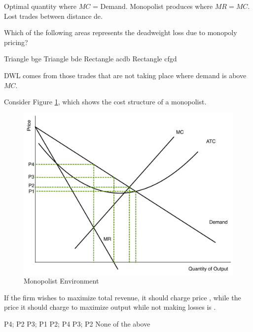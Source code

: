 \documentclass[addpoints,11pt]{exam}
\theoremstyle{definition}
\begin{document}
\begin{questions}
	\begin{solution}
		Optimal quantity where $MC$ = Demand. Monopolist produces where $MR = MC$. Lost trades between distance de.
	\end{solution}
	
	\question \label{blah6} Which of the following areas represents the deadweight loss due to monopoly pricing?
	
	\begin{choices}
		\CorrectChoice Triangle bge
		\choice Triangle bde
		\choice Rectangle acdb
		\choice Rectangle cfgd
	\end{choices}
	
	\begin{solution}
		DWL comes from those trades that are not taking place where demand is above $MC$.
	\end{solution}
	
	
\question Consider Figure \ref{MC35}, which shows the cost structure of a monopolist.


\begin{figure}[h!]
	\centering
	\includegraphics[scale=.40]{Final_MC35.pdf}
	\caption{Monopolist Environment}
	\label{MC35}
\end{figure}

If the firm wishes to maximize total revenue, it should charge price \underline{\hspace{3cm}}, while the price it should charge to maximize output while not making losses is \underline{\hspace{3cm}}.

\begin{choices}
	\choice P4; P2
	\CorrectChoice P3; P1
	\choice P2; P4
	\choice P3; P2
	\choice None of the above
\end{choices}


\end{questions}
\end{document}
